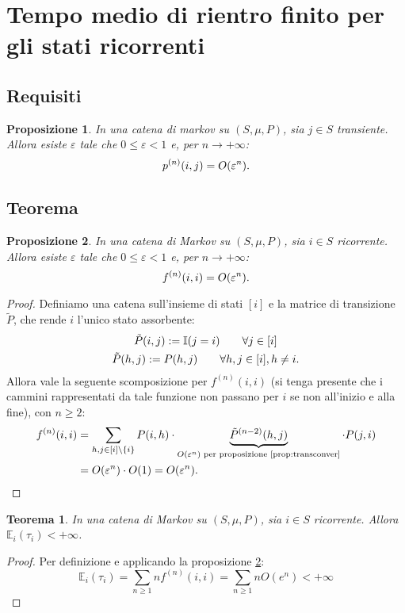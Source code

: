 \documentclass{article}
\theoremstyle{plain}
\newtheorem{thm}{Teorema}
\newtheorem{prop}{Proposizione}
\newcommand{\indic}{\mathbb I}
\newcommand{\ev}{\mathbb E}
\renewcommand{\epsilon}{\varepsilon}
\begin{document}
\section{Tempo medio di rientro finito per gli stati ricorrenti}


\subsection{Requisiti}
\begin{prop}\label{prop:transconver}
	In una catena di markov su $(S,\mu,P)$, sia $j\in S$ transiente. Allora esiste $\epsilon$ tale che $0\le\epsilon<1$ e, per $n\to+\infty$:
	\begin{equation*}
		p^{(n)}(i,j) = O(\epsilon^n) \text.
	\end{equation*}
\end{prop}


\subsection{Teorema}
\begin{prop}\label{prop:ricorconv}
	In una catena di Markov su $(S,\mu,P)$, sia $i\in S$ ricorrente. Allora esiste $\epsilon$ tale che $0\le\epsilon<1$ e, per $n\to+\infty$:
	\begin{equation*}
		f^{(n)}(i,i) = O(\epsilon^n) \text.
	\end{equation*}
\end{prop}
\begin{proof}
	Definiamo una catena sull'insieme di stati $[i]$ e la matrice di transizione $\tilde P$, che rende $i$ l'unico stato assorbente:
	\begin{gather*}
		\tilde P(i,j) := \indic(j=i) \qquad\forall j\in[i] \\
		\tilde P(h,j) := P(h,j) \qquad\forall h,j\in[i], h\neq i \text.
	\end{gather*}
	Allora vale la seguente scomposizione per $f^{(n)}(i,i)$ (si tenga presente che i cammini rappresentati da tale funzione non passano per $i$ se non all'inizio e alla fine), con $n\ge2$:
	\begin{align*}
		f^{(n)}(i,i) & = \sum_{h,j\in[i]\setminus\{i\}} P(i,h)\cdot\underbrace{\tilde P^{(n-2)}(h,j)}_{O(\epsilon^n)\text{ per proposizione \ref{prop:transconver}}}\cdot P(j,i) \\
		             & = O(\epsilon^n)\cdot O(1) = O(\epsilon^n) \text. \qedhere
	\end{align*}
\end{proof}

\begin{thm}
	In una catena di Markov su $(S,\mu,P)$, sia $i\in S$ ricorrente. Allora $\ev_i(\tau_i)<+\infty$.
\end{thm}
\begin{proof}
	Per definizione e applicando la proposizione \ref{prop:ricorconv}:
	\begin{equation*}
		\ev_i(\tau_i) = \sum_{n\ge1} nf^{(n)}(i,i) = \sum_{n\ge1} nO(e^n) < +\infty
	\end{equation*}
\end{proof}
\end{document}

